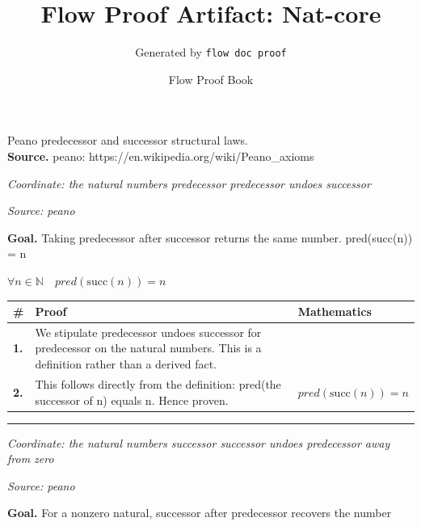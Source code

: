\documentclass[11pt]{article}
\title{Flow Proof Artifact: Nat-core}
\author{Generated by \texttt{flow doc proof}}
\date{Flow Proof Book}
\theoremstyle{definition}
\begin{document}
\maketitle
Peano predecessor and successor structural laws.\\[0.5em]
\textbf{Source.} peano: https://en.wikipedia.org/wiki/Peano\_axioms\\[0.5em]
\bigskip
{}\par
\smallskip\noindent\textit{Coordinate: the natural numbers \cdot predecessor \cdot predecessor undoes successor}\par
\smallskip\noindent\textit{Source: peano}\par
\medskip
\noindent\textbf{Goal.} Taking predecessor after successor returns the same number.  pred(succ(n)) = n\par
\noindent$\displaystyle \forall n \in \mathbb{N}\quad pred(\mathrm{succ}(n)) = n$\par
\medskip
\noindent
\begin{tabular}{@{} >{\raggedright\arraybackslash}p{} >{\raggedright\arraybackslash}p{} >{\raggedleft\arraybackslash}p{} @{}}
\textbf{\#} & \textbf{Proof} & \textbf{Mathematics} \\
\midrule
\textbf{1.} & We stipulate predecessor undoes successor for predecessor on the natural numbers. This is a definition rather than a derived fact. & \\[0.45em]
\textbf{2.} & This follows directly from the definition: pred(the successor of n) equals n. Hence proven. & $\displaystyle pred(\mathrm{succ}(n)) = n$ \\[0.45em]
\bottomrule
\end{tabular}
\label{thm:Nat-predecessor-predecessor_undoes_successor}
\par\medskip\hrule
\bigskip
{}\par
\smallskip\noindent\textit{Coordinate: the natural numbers \cdot successor \cdot successor undoes predecessor away from zero}\par
\smallskip\noindent\textit{Source: peano}\par
\medskip
\noindent\textbf{Goal.} For a nonzero natural, successor after predecessor recovers the number\par
\end{document}
